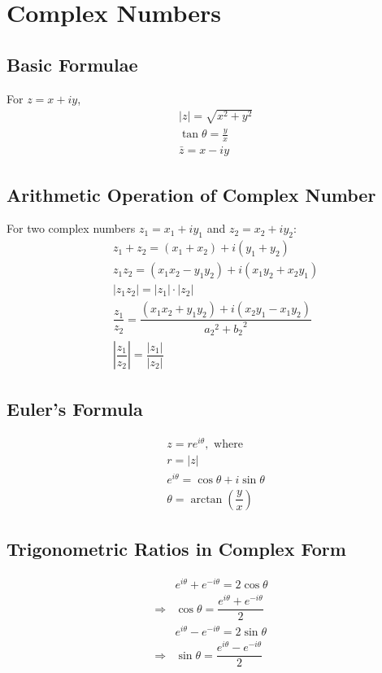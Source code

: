 \documentclass[../main.tex]{subfiles}
\begin{document}
\chapter{Complex Numbers}
	\section{Basic Formulae}
	For $z=x+iy$,
	\begin{align}
		& \left| z \right| = \sqrt{x^2+y^2}\\
		& \tan \theta = \frac{y}{x}\\
		& \bar{z} = x-iy
	\end{align}

	\section{Arithmetic Operation of Complex Number}
	For two complex numbers $z_1=x_1+iy_1$ and $z_2=x_2+iy_2$:
	\begin{align}
		& z_1 + z_2 = (x_1+x_2) + i(y_1+y_2)\\
		& z_1 z_2 = (x_1x_2-y_1y_2) + i (x_1y_2+x_2y_1)\\
		& \left| z_1z_2 \right|  = \left| z_1 \right| \cdot \left| z_2 \right|\\
		& \dfrac{z_1}{z_2} = \dfrac{(x_1x_2+y_1y_2)+i(x_2y_1-x_1y_2)}{{a_2}^2+{b_2}^2}\\
		& \left| \dfrac{z_1}{z_2} \right| =\dfrac{\left| z_1 \right|}{\left| z_2 \right|}
	\end{align}
	
	\section{Euler's Formula}
	\begin{align}
		& z = re^{i\theta}, \text{ where} \\
		& r = \left| z \right| \\
		& e^{i\theta} = \cos \theta + i \sin \theta \\
		& \theta = \arctan \left(\dfrac{y}{x}\right)
	\end{align}
	
	\section{Trigonometric Ratios in Complex Form}
	\begin{align}
		& e^{i\theta}+e^{-i\theta}=2\cos\theta\\
		\Rightarrow & \cos \theta=\dfrac{e^{i\theta}+e^{-i\theta}}{2}\\
		& e^{i\theta}-e^{-i\theta}=2\sin\theta\\
		\Rightarrow & \sin \theta=\dfrac{e^{i\theta}-e^{-i\theta}}{2}
	\end{align}
	
\end{document}

